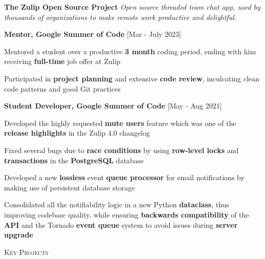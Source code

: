 \documentclass[10pt]{article}
\renewcommand{\section}[1]{
    \vspace*{5pt}
    \textsc{\Large{#1}}
    \vspace*{-8pt} \\ \hspace*{-5pt}
    \hrulefill \\
    \vspace*{-15pt}
    \vspace*{-5pt}
}
\newcommand{\smallbullet}{
    \small$\bullet$
}
\newcommand{\company}[2]{
    {
        \vspace*{3pt}
        \hspace*{-7pt} {\large{\textbf{#1}}} \newline
        \textit{\textsf{#2}} \newline
    }
}
\newcommand{\position}[2]{
    {
        \vspace*{3pt}
        \hspace*{3pt} {\normalsize{\textbf{#1}}} \hfill #2
        \newline
        \vspace{-15pt}
    }
}
\newenvironment{bullet-list-position}{
    \begin{list}{
        \smallbullet
    }{
        \setlength\leftmargin{20pt}\topsep -6pt \itemsep -5pt
    }
} {
    \end{list}
}
\begin{document}

    \vspace{5pt}
    \company{
        The Zulip Open Source Project
    }{
        Open source threaded team chat app, used by thousands of organizations to make remote work productive and delightful.
    }
    \position{Mentor, Google Summer of Code}{[Mar - July 2023]}
    \begin{bullet-list-position}
        \item Mentored a student over a productive \textbf{3 month} coding period, ending with him receiving \textbf{full-time} job offer at Zulip
        \item Participated in \textbf{project planning} and extensive \textbf{code review}, inculcating clean code patterns and good Git practices
    \end{bullet-list-position}
    \position{Student Developer, Google Summer of Code}{[May - Aug 2021]}
    \vspace{3pt}
    \begin{bullet-list-position}
        \item Developed the highly requested \textbf{mute users} feature which was one of the \textbf{release highlights} in the Zulip 4.0 changelog
        \item Fixed several bugs due to \textbf{race conditions} by using \textbf{row-level locks} and \textbf{transactions} in the \textbf{PostgreSQL} database
        \item Developed a new \textbf{lossless} event \textbf{queue processor} for email notifications by making use of persistent database storage
        \item Consolidated all the notifiability logic in a new Python \textbf{dataclass}, thus improving codebase quality, while ensuring \textbf{backwards compatibility} of the \textbf{API} and the Tornado \textbf{event queue} system to avoid issues during \textbf{server upgrade}
    \end{bullet-list-position}


    \section{Key Projects}
\end{document}
